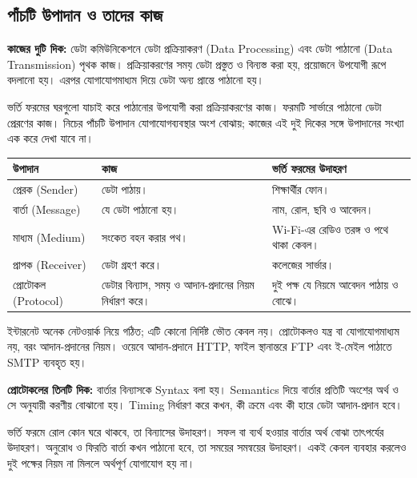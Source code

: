 \subsection{পাঁচটি উপাদান ও তাদের কাজ}
\label{ch2:c01-02}
\textbf{কাজের দুটি দিক:} ডেটা কমিউনিকেশনে ডেটা প্রক্রিয়াকরণ (Data Processing) এবং ডেটা পাঠানো (Data Transmission) পৃথক কাজ। প্রক্রিয়াকরণের সময় ডেটা প্রস্তুত ও বিন্যস্ত করা হয়, প্রয়োজনে উপযোগী রূপে বদলানো হয়। এরপর যোগাযোগমাধ্যম দিয়ে ডেটা অন্য প্রান্তে পাঠানো হয়।

ভর্তি ফরমের ঘরগুলো যাচাই করে পাঠানোর উপযোগী করা প্রক্রিয়াকরণের কাজ। ফরমটি সার্ভারে পাঠানো ডেটা প্রেরণের কাজ। নিচের পাঁচটি উপাদান যোগাযোগব্যবস্থার অংশ বোঝায়; কাজের এই দুই দিকের সঙ্গে উপাদানের সংখ্যা এক করে দেখা যাবে না।

\begin{tabularx}{\linewidth}{|p{.20\linewidth}|X|X|}
\hline
\textbf{উপাদান} & \textbf{কাজ} & \textbf{ভর্তি ফরমের উদাহরণ}\\\hline
প্রেরক (Sender) & ডেটা পাঠায়। & শিক্ষার্থীর ফোন।\\\hline
বার্তা (Message) & যে ডেটা পাঠানো হয়। & নাম, রোল, ছবি ও আবেদন।\\\hline
মাধ্যম (Medium) & সংকেত বহন করার পথ। & Wi-Fi-এর রেডিও তরঙ্গ ও পথে থাকা কেবল।\\\hline
প্রাপক (Receiver) & ডেটা গ্রহণ করে। & কলেজের সার্ভার।\\\hline
প্রোটোকল (Protocol) & ডেটার বিন্যাস, সময় ও আদান-প্রদানের নিয়ম নির্ধারণ করে। & দুই পক্ষ যে নিয়মে আবেদন পাঠায় ও বোঝে।\\\hline
\end{tabularx}

ইন্টারনেট অনেক নেটওয়ার্ক নিয়ে গঠিত; এটি কোনো নির্দিষ্ট ভৌত কেবল নয়। প্রোটোকলও যন্ত্র বা যোগাযোগমাধ্যম নয়, বরং আদান-প্রদানের নিয়ম। ওয়েবে আদান-প্রদানে HTTP, ফাইল স্থানান্তরে FTP এবং ই-মেইল পাঠাতে SMTP ব্যবহৃত হয়।

\textbf{প্রোটোকলের তিনটি দিক:} বার্তার বিন্যাসকে Syntax বলা হয়। Semantics দিয়ে বার্তার প্রতিটি অংশের অর্থ ও সে অনুযায়ী করণীয় বোঝানো হয়। Timing নির্ধারণ করে কখন, কী ক্রমে এবং কী হারে ডেটা আদান-প্রদান হবে।

ভর্তি ফরমে রোল কোন ঘরে থাকবে, তা বিন্যাসের উদাহরণ। সফল বা ব্যর্থ হওয়ার বার্তার অর্থ বোঝা তাৎপর্যের উদাহরণ। অনুরোধ ও ফিরতি বার্তা কখন পাঠানো হবে, তা সময়ের সমন্বয়ের উদাহরণ। একই কেবল ব্যবহার করলেও দুই পক্ষের নিয়ম না মিললে অর্থপূর্ণ যোগাযোগ হয় না।

